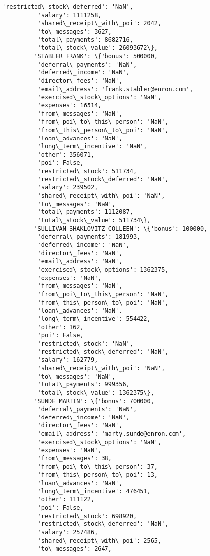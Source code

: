 \documentclass[11pt]{article}
\begin{document}
\begin{Verbatim}[commandchars=\\\{\}]
          'restricted\_stock\_deferred': 'NaN',
          'salary': 1111258,
          'shared\_receipt\_with\_poi': 2042,
          'to\_messages': 3627,
          'total\_payments': 8682716,
          'total\_stock\_value': 26093672\},
         'STABLER FRANK': \{'bonus': 500000,
          'deferral\_payments': 'NaN',
          'deferred\_income': 'NaN',
          'director\_fees': 'NaN',
          'email\_address': 'frank.stabler@enron.com',
          'exercised\_stock\_options': 'NaN',
          'expenses': 16514,
          'from\_messages': 'NaN',
          'from\_poi\_to\_this\_person': 'NaN',
          'from\_this\_person\_to\_poi': 'NaN',
          'loan\_advances': 'NaN',
          'long\_term\_incentive': 'NaN',
          'other': 356071,
          'poi': False,
          'restricted\_stock': 511734,
          'restricted\_stock\_deferred': 'NaN',
          'salary': 239502,
          'shared\_receipt\_with\_poi': 'NaN',
          'to\_messages': 'NaN',
          'total\_payments': 1112087,
          'total\_stock\_value': 511734\},
         'SULLIVAN-SHAKLOVITZ COLLEEN': \{'bonus': 100000,
          'deferral\_payments': 181993,
          'deferred\_income': 'NaN',
          'director\_fees': 'NaN',
          'email\_address': 'NaN',
          'exercised\_stock\_options': 1362375,
          'expenses': 'NaN',
          'from\_messages': 'NaN',
          'from\_poi\_to\_this\_person': 'NaN',
          'from\_this\_person\_to\_poi': 'NaN',
          'loan\_advances': 'NaN',
          'long\_term\_incentive': 554422,
          'other': 162,
          'poi': False,
          'restricted\_stock': 'NaN',
          'restricted\_stock\_deferred': 'NaN',
          'salary': 162779,
          'shared\_receipt\_with\_poi': 'NaN',
          'to\_messages': 'NaN',
          'total\_payments': 999356,
          'total\_stock\_value': 1362375\},
         'SUNDE MARTIN': \{'bonus': 700000,
          'deferral\_payments': 'NaN',
          'deferred\_income': 'NaN',
          'director\_fees': 'NaN',
          'email\_address': 'marty.sunde@enron.com',
          'exercised\_stock\_options': 'NaN',
          'expenses': 'NaN',
          'from\_messages': 38,
          'from\_poi\_to\_this\_person': 37,
          'from\_this\_person\_to\_poi': 13,
          'loan\_advances': 'NaN',
          'long\_term\_incentive': 476451,
          'other': 111122,
          'poi': False,
          'restricted\_stock': 698920,
          'restricted\_stock\_deferred': 'NaN',
          'salary': 257486,
          'shared\_receipt\_with\_poi': 2565,
          'to\_messages': 2647,

\end{Verbatim}
\end{document}
